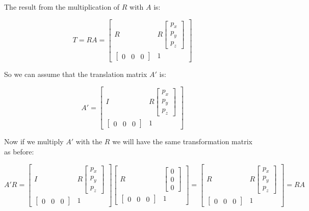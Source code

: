 The result from the multiplication of \(R\) with \(A\) is:

\[
T = RA = 
\begin{bmatrix}
R &  R\begin{bmatrix} p_x\\p_y\\p_z \end{bmatrix}\\
\begin{bmatrix}
0 & 0 & 0
\end{bmatrix} & 1
\end{bmatrix}
\]

So we can assume that the translation matrix \(A'\) is:

\[
A' = 
\begin{bmatrix}
I &  R\begin{bmatrix} p_x\\p_y\\p_z \end{bmatrix}\\
\begin{bmatrix}
0 & 0 & 0
\end{bmatrix} & 1
\end{bmatrix}
\]

Now if we multiply \(A'\) with the \(R\) we will have the same transformation matrix as before:
 
\[
A'R = 
\begin{bmatrix}
I &  R\begin{bmatrix} p_x\\p_y\\p_z \end{bmatrix}\\
\begin{bmatrix}
0 & 0 & 0
\end{bmatrix} & 1
\end{bmatrix}
\begin{bmatrix}
R &  \begin{bmatrix} 0\\0\\0 \end{bmatrix}\\
\begin{bmatrix}
0 & 0 & 0
\end{bmatrix} & 1
\end{bmatrix}
= 
\begin{bmatrix}
R &  R\begin{bmatrix} p_x\\p_y\\p_z \end{bmatrix}\\
\begin{bmatrix}
0 & 0 & 0
\end{bmatrix} & 1
\end{bmatrix} =
RA
\]

